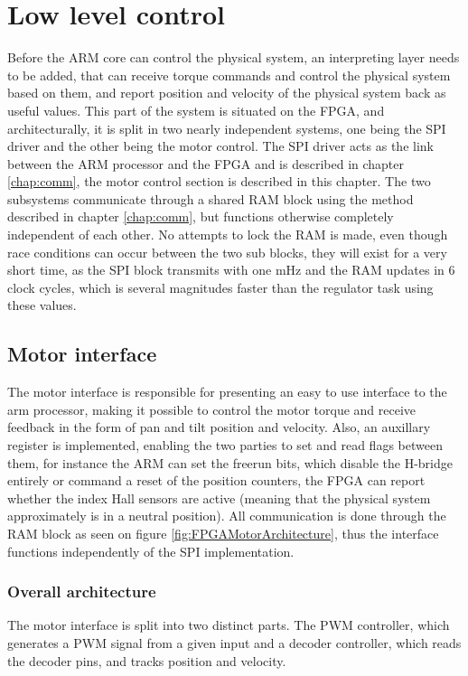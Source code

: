 \chapter{Low level control}\label{chap:llc}
Before the ARM core can control the physical system, an interpreting layer needs to be added, that can receive torque commands and control the physical system based on them, and report position and velocity of the physical system back as useful values.
This part of the system is situated on the FPGA, and architecturally, it is split in two nearly independent systems, one being the SPI driver and the other being the motor control.
The SPI driver acts as the link between the ARM processor and the FPGA and is described in chapter \ref{chap:comm}, the motor control section is described in this chapter.
The two subsystems communicate through a shared RAM block using the method described in chapter \ref{chap:comm}, but functions otherwise completely independent of each other.
No attempts to lock the RAM is made, even though race conditions can occur between the two sub blocks, they will exist for a very short time, as the SPI block transmits with one mHz and the RAM updates in 6 clock cycles, which is several magnitudes faster than the regulator task using these values.


\section{Motor interface}
The motor interface is responsible for presenting an easy to use interface to the arm processor, making it possible to control the motor torque and receive feedback in the form of pan and tilt position and velocity.
Also, an auxillary register is implemented, enabling the two parties to set and read flags between them, for instance the ARM can set the freerun bits, which disable the H-bridge entirely or command a reset of the position counters, the FPGA can report whether the index Hall sensors are active (meaning that the physical system approximately is in a neutral position).
All communication is done through the RAM block as seen on figure \ref{fig:FPGAMotorArchitecture}, thus the interface functions independently of the SPI implementation.

\subsection{Overall architecture}
The motor interface is split into two distinct parts. The PWM controller, which generates a PWM signal from a given input and a decoder controller, which reads the decoder pins, and tracks position and velocity.

